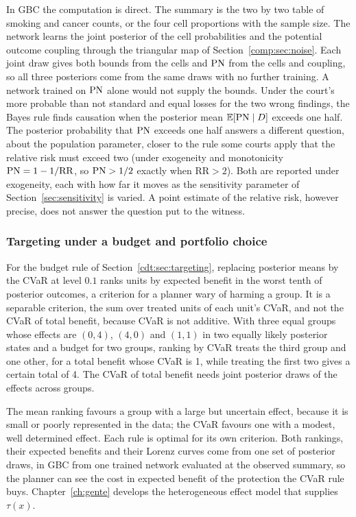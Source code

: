 In GBC the computation is direct. The summary is the two by two table of smoking and cancer counts, or the four cell proportions with the sample size. The network learns the joint posterior of the cell probabilities and the potential outcome coupling through the triangular map of Section~\ref{comp:sec:noise}. Each joint draw gives both bounds from the cells and $\mathrm{PN}$ from the cells and coupling, so all three posteriors come from the same draws with no further training. A network trained on $\mathrm{PN}$ alone would not supply the bounds. Under the court's more probable than not standard and equal losses for the two wrong findings, the Bayes rule finds causation when the posterior mean $\mathbb{E}[\mathrm{PN}\mid D]$ exceeds one half. The posterior probability that $\mathrm{PN}$ exceeds one half answers a different question, about the population parameter, closer to the rule some courts apply that the relative risk must exceed two (under exogeneity and monotonicity $\mathrm{PN}=1-1/\mathrm{RR}$, so $\mathrm{PN}>1/2$ exactly when $\mathrm{RR}>2$). Both are reported under exogeneity, each with how far it moves as the sensitivity parameter of Section~\ref{sec:sensitivity} is varied. A point estimate of the relative risk, however precise, does not answer the question put to the witness.

\subsubsection{Targeting under a budget and portfolio choice}

For the budget rule of Section~\ref{cdt:sec:targeting}, replacing posterior means by the CVaR at level $0.1$ ranks units by expected benefit in the worst tenth of posterior outcomes, a criterion for a planner wary of harming a group. It is a separable criterion, the sum over treated units of each unit's CVaR, and not the CVaR of total benefit, because CVaR is not additive. With three equal groups whose effects are $(0,4)$, $(4,0)$ and $(1,1)$ in two equally likely posterior states and a budget for two groups, ranking by CVaR treats the third group and one other, for a total benefit whose CVaR is 1, while treating the first two gives a certain total of 4. The CVaR of total benefit needs joint posterior draws of the effects across groups.

The mean ranking favours a group with a large but uncertain effect, because it is small or poorly represented in the data; the CVaR favours one with a modest, well determined effect. Each rule is optimal for its own criterion. Both rankings, their expected benefits and their Lorenz curves come from one set of posterior draws, in GBC from one trained network evaluated at the observed summary, so the planner can see the cost in expected benefit of the protection the CVaR rule buys. Chapter~\ref{ch:gente} develops the heterogeneous effect model that supplies $\tau(x)$.

